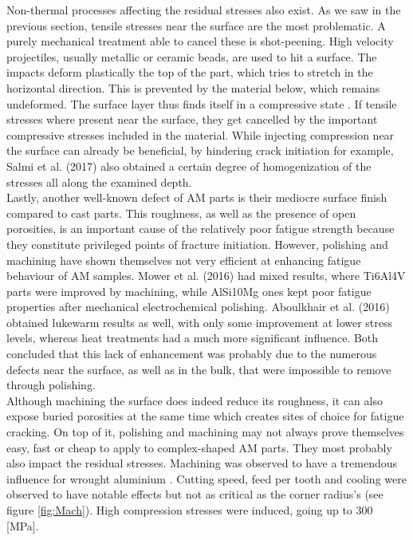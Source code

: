 Non-thermal processes affecting the residual stresses also exist. As we saw in the previous section, tensile stresses near the surface are the most problematic. A purely mechanical treatment able to cancel these is shot-peening. High velocity projectiles, usually metallic or ceramic beads, are used to hit a surface. The impacts deform plastically the top of the part, which tries to stretch in the horizontal direction. This is prevented by the material below, which remains undeformed. The surface layer thus finds itself in a compressive state \cite{Vrancken2016}. If tensile stresses where present near the surface, they get cancelled by the important compressive stresses included in the material. While injecting compression near the surface can already be beneficial, by hindering crack initiation for example, Salmi et al. (2017) \cite{Salmi2017} also obtained a certain degree of homogenization of the stresses all along the examined depth. \\

Lastly, another well-known defect of AM parts is their mediocre surface finish compared to cast parts. This roughness, as well as the presence of open porosities, is an important cause of the relatively poor fatigue strength because they constitute privileged points of fracture initiation. However, polishing and machining have shown themselves not very efficient at enhancing fatigue behaviour of AM samples. Mower et al. (2016)\cite{MOWER2016198} had mixed results, where Ti6Al4V parts were improved by machining, while AlSi10Mg ones kept poor fatigue properties after mechanical electrochemical polishing. Aboulkhair et al. (2016) \cite{ABOULKHAIR2016bis} obtained lukewarm results as well, with only some improvement at lower stress levels, whereas heat treatments had a much more significant influence. Both concluded that this lack of enhancement was probably due to the numerous defects near the surface, as well as in the bulk, that were impossible to remove through polishing. \\

Although machining the surface does indeed reduce its roughness, it can also expose buried porosities at the same time which creates sites of choice for fatigue cracking. On top of it, polishing and machining may not always prove themselves easy, fast or cheap to apply to complex-shaped AM parts. They most probably also impact the residual stresses. Machining was observed to have a tremendous influence for wrought aluminium \parencite{Denkena2007}. Cutting speed, feed per tooth and cooling were observed to have notable effects but not as critical as the corner radius's (see figure \ref{fig:Mach}). High compression stresses were induced, going up to 300 [MPa].\\

